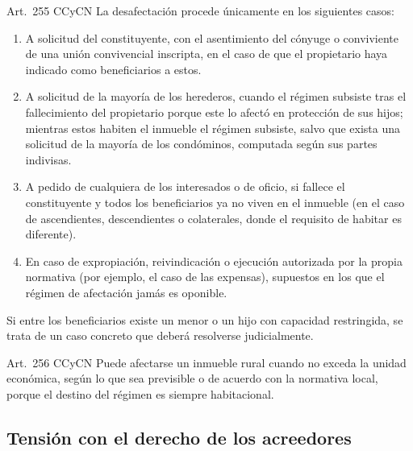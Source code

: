\documentclass[12pt,oneside]{book}
\begin{document}
\begin{regla}{Art.~255 CCyCN}
La desafectación procede únicamente en los siguientes casos:
\begin{enumerate}
    \item A solicitud del constituyente, con el asentimiento del cónyuge o conviviente de una unión convivencial inscripta, en el caso de que el propietario haya indicado como beneficiarios a estos.
    \item A solicitud de la mayoría de los herederos, cuando el régimen subsiste tras el fallecimiento del propietario porque este lo afectó en protección de sus hijos; mientras estos habiten el inmueble el régimen subsiste, salvo que exista una solicitud de la mayoría de los condóminos, computada según sus partes indivisas.
    \item A pedido de cualquiera de los interesados o de oficio, si fallece el constituyente y todos los beneficiarios ya no viven en el inmueble (en el caso de ascendientes, descendientes o colaterales, donde el requisito de habitar es diferente).
    \item En caso de expropiación, reivindicación o ejecución autorizada por la propia normativa (por ejemplo, el caso de las expensas), supuestos en los que el régimen de afectación jamás es oponible.
\end{enumerate}
\end{regla}

\begin{nota}
Si entre los beneficiarios existe un menor o un hijo con capacidad restringida, se trata de un caso concreto que deberá resolverse judicialmente.
\end{nota}

\begin{regla}{Art.~256 CCyCN}
Puede afectarse un inmueble rural cuando no exceda la unidad económica, según lo que sea previsible o de acuerdo con la normativa local, porque el destino del régimen es siempre habitacional.
\end{regla}

\subsection{Tensión con el derecho de los acreedores}
\end{document}
